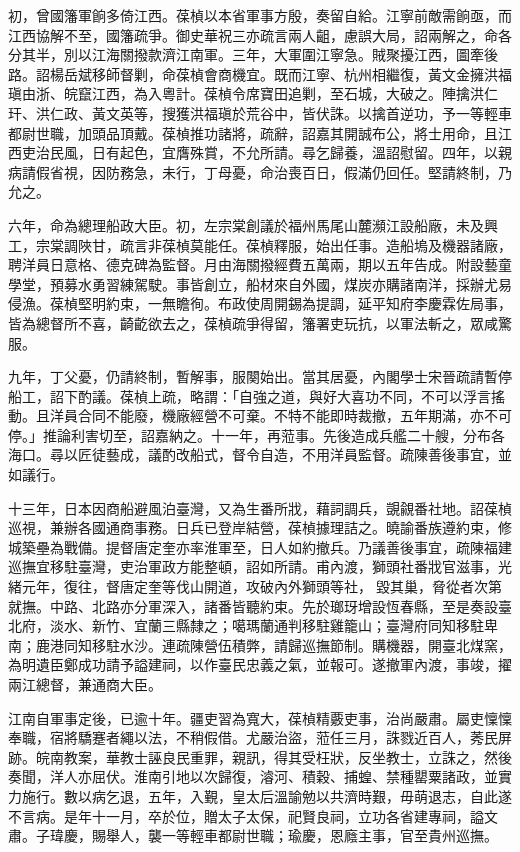 \begin{pinyinscope}
初，曾國籓軍餉多倚江西。葆楨以本省軍事方殷，奏留自給。江寧前敵需餉亟，而江西協解不至，國籓疏爭。御史華祝三亦疏言兩人齟，慮誤大局，詔兩解之，命各分其半，別以江海關撥款濟江南軍。三年，大軍圍江寧急。賊聚擾江西，圖牽後路。詔楊岳斌移師督剿，命葆楨會商機宜。既而江寧、杭州相繼復，黃文金擁洪福瑱由浙、皖竄江西，為入粵計。葆楨令席寶田追剿，至石城，大破之。陣擒洪仁玕、洪仁政、黃文英等，搜獲洪福瑱於荒谷中，皆伏誅。以擒首逆功，予一等輕車都尉世職，加頭品頂戴。葆楨推功諸將，疏辭，詔嘉其開誠布公，將士用命，且江西吏治民風，日有起色，宜膺殊賞，不允所請。尋乞歸養，溫詔慰留。四年，以親病請假省視，因防務急，未行，丁母憂，命治喪百日，假滿仍回任。堅請終制，乃允之。

六年，命為總理船政大臣。初，左宗棠創議於福州馬尾山麓瀕江設船廠，未及興工，宗棠調陜甘，疏言非葆楨莫能任。葆楨釋服，始出任事。造船塢及機器諸廠，聘洋員日意格、德克碑為監督。月由海關撥經費五萬兩，期以五年告成。附設藝童學堂，預募水勇習練駕駛。事皆創立，船材來自外國，煤炭亦購諸南洋，採辦尤易侵漁。葆楨堅明約束，一無瞻徇。布政使周開錫為提調，延平知府李慶霖佐局事，皆為總督所不喜，齮齕欲去之，葆楨疏爭得留，籓署吏玩抗，以軍法斬之，眾咸驚服。

九年，丁父憂，仍請終制，暫解事，服闋始出。當其居憂，內閣學士宋晉疏請暫停船工，詔下酌議。葆楨上疏，略謂：「自強之道，與好大喜功不同，不可以浮言搖動。且洋員合同不能廢，機廠經營不可棄。不特不能即時裁撤，五年期滿，亦不可停。」推論利害切至，詔嘉納之。十一年，再蒞事。先後造成兵艦二十艘，分布各海口。尋以匠徒藝成，議酌改船式，督令自造，不用洋員監督。疏陳善後事宜，並如議行。

十三年，日本因商船避風泊臺灣，又為生番所戕，藉詞調兵，覬覦番社地。詔葆楨巡視，兼辦各國通商事務。日兵已登岸結營，葆楨據理詰之。曉諭番族遵約束，修城築壘為戰備。提督唐定奎亦率淮軍至，日人如約撤兵。乃議善後事宜，疏陳福建巡撫宜移駐臺灣，吏治軍政方能整頓，詔如所請。甫內渡，獅頭社番戕官滋事，光緒元年，復往，督唐定奎等伐山開道，攻破內外獅頭等社，毀其巢，脅從者次第就撫。中路、北路亦分軍深入，諸番皆聽約束。先於瑯玡增設恆春縣，至是奏設臺北府，淡水、新竹、宜蘭三縣隸之；噶瑪蘭通判移駐雞籠山；臺灣府同知移駐卑南；鹿港同知移駐水沙。連疏陳營伍積弊，請歸巡撫節制。購機器，開臺北煤窯，為明遺臣鄭成功請予謚建祠，以作臺民忠義之氣，並報可。遂撤軍內渡，事竣，擢兩江總督，兼通商大臣。

江南自軍事定後，已逾十年。疆吏習為寬大，葆楨精覈吏事，治尚嚴肅。屬吏懍懍奉職，宿將驕蹇者繩以法，不稍假借。尤嚴治盜，蒞任三月，誅戮近百人，莠民屏跡。皖南教案，華教士誣良民重罪，親訊，得其受枉狀，反坐教士，立誅之，然後奏聞，洋人亦屈伏。淮南引地以次歸復，濬河、積穀、捕蝗、禁種罌粟諸政，並實力施行。數以病乞退，五年，入覲，皇太后溫諭勉以共濟時艱，毋萌退志，自此遂不言病。是年十一月，卒於位，贈太子太保，祀賢良祠，立功各省建專祠，謚文肅。子瑋慶，賜舉人，襲一等輕車都尉世職；瑜慶，恩廕主事，官至貴州巡撫。


\end{pinyinscope}
